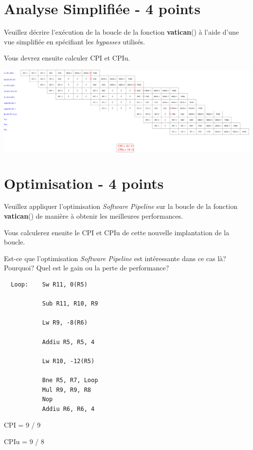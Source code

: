 %
%

\section{Analyse Simplifi\'ee - 4 points}

Veuillez d\'ecrire l'ex\'ecution de la boucle de la fonction \textbf{vatican}()
\`a l'aide d'une vue simplifi\'ee en sp\'ecifiant les \textit{bypasses}
utilis\'es.

Vous devrez ensuite calculer CPI et CPIu.

\begin{correction}

  \begin{center}
    \includegraphics[scale=0.33]{figures/correction-analyse-simplifiee.pdf}
  \end{center}

\end{correction}

%
%

\section{Optimisation - 4 points}

Veuillez appliquer l'optimisation \textit{Software Pipeline} sur
la boucle de la fonction \textbf{vatican}() de mani\`ere \`a obtenir
les meilleures performances.

Vous calculerez ensuite le CPI et CPIu de cette nouvelle implantation
de la boucle.

Est-ce que l'optimisation \textit{Software Pipeline} est int\'eressante
dans ce cas l\`a? Pourquoi? Quel est le gain ou la perte de performance?

\begin{correction}

  \begin{verbatim}
  Loop:    Sw R11, 0(R5)

           Sub R11, R10, R9

           Lw R9, -8(R6)

           Addiu R5, R5, 4

           Lw R10, -12(R5)

           Bne R5, R7, Loop
           Mul R9, R9, R8
           Nop
           Addiu R6, R6, 4
  \end{verbatim}

  CPI = 9 / 9

  CPIu = 9 / 8

\end{correction}

